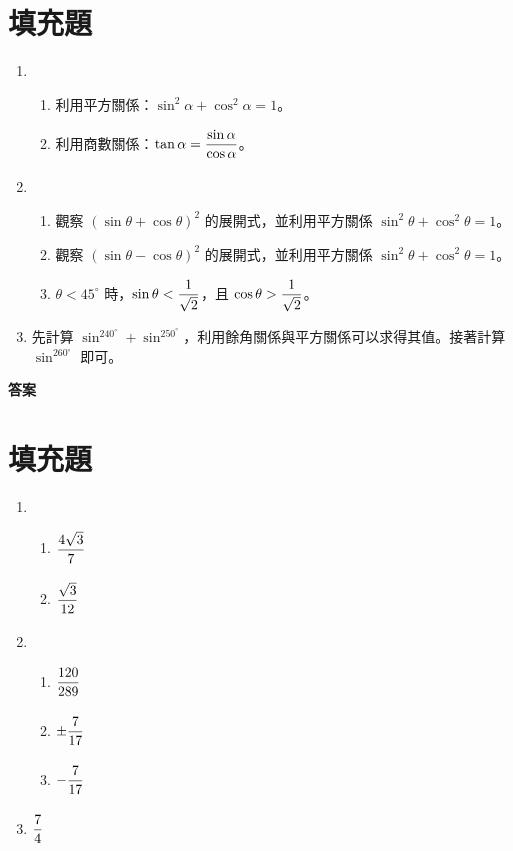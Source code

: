 \documentclass[10pt]{article}
\newcommand*{\fraction}[2]{\rule[-.8\baselineskip]{0pt}{2\baselineskip}\dfrac{#1}{#2}}
\begin{document}
\section{填充題}
\begin{enumerate}[label=\Alph*.,left=0pt]
  \item
  \begin{enumerate}[label=(\arabic*),left=0pt]
    \item 利用平方關係：$\sin^2\alpha + \cos^2\alpha = 1$。
    \item 利用商數關係：$\tan \alpha = \fraction{\sin\alpha}{\cos\alpha}$。
  \end{enumerate}
  \item
  \begin{enumerate}[label=(\arabic*),left=0pt]
    \item 觀察 $(\sin \theta + \cos \theta)^2$ 的展開式，並利用平方關係 $\sin^2\theta + \cos^2\theta = 1$。
    \item 觀察 $(\sin \theta - \cos \theta)^2$ 的展開式，並利用平方關係 $\sin^2\theta + \cos^2\theta = 1$。
    \item $\theta < 45^\circ$ 時，$\sin\theta < \fraction{1}{\sqrt{2}}$，且 $\cos\theta > \fraction{1}{\sqrt{2}}$。
  \end{enumerate}
  \item 先計算 $\sin^240^\circ+\sin^250^\circ$，利用餘角關係與平方關係可以求得其值。接著計算 $\sin^260^\circ$ 即可。
\end{enumerate}

\newpage
\label{answer}
{\bfseries\large 答案 \par}
\setcounter{section}{0}
\section{填充題}
\begin{enumerate}[label=\Alph*.,left=0pt]
  \item
  \begin{enumerate}[label=(\arabic*),left=0pt]
    \item $\fraction{4\sqrt{3}}{7}$
    \item $\fraction{\sqrt{3}}{12}$
  \end{enumerate}
  \item
  \begin{enumerate}[label=(\arabic*),left=0pt]
    \item $\fraction{120}{289}$
    \item $\pm\fraction{7}{17}$
    \item $-\fraction{7}{17}$
  \end{enumerate}
  \item $\fraction{7}{4}$
\end{enumerate}
\end{document}

